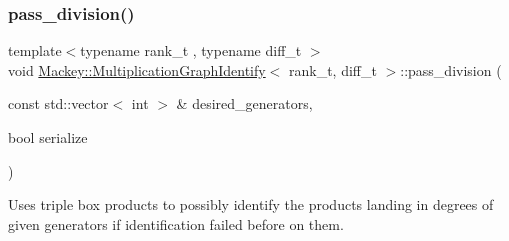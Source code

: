 \subsubsection{\texorpdfstring{pass\+\_\+division()}{pass\_division()}}
{\footnotesize\ttfamily template$<$typename rank\+\_\+t , typename diff\+\_\+t $>$ \\
void \hyperlink{classMackey_1_1MultiplicationGraphIdentify}{Mackey\+::\+Multiplication\+Graph\+Identify}$<$ rank\+\_\+t, diff\+\_\+t $>$\+::pass\+\_\+division (\begin{DoxyParamCaption}\item[{const std\+::vector$<$ int $>$ \&}]{desired\+\_\+generators,  }\item[{bool}]{serialize }\end{DoxyParamCaption})\hspace{0.3cm}{\ttfamily [protected]}}



Uses triple box products to possibly identify the products landing in degrees of given generators if identification failed before on them. 


